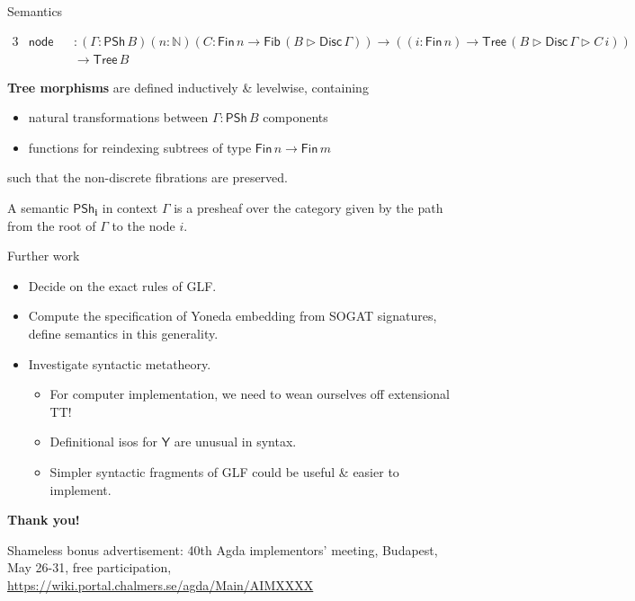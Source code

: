 \documentclass[dvipsnames,aspectratio=169]{beamer}
\newcommand{\ms}[1]{\mathsf{#1}}
\newcommand{\mbb}[1]{\mathbb{#1}}
\newcommand{\bs}[1]{\boldsymbol{#1}}
\newcommand{\Y}{\mathsf{Y}}
\newcommand{\Fib}{\mathsf{Fib}}
\newcommand{\Fin}{\mathsf{Fin}}
\newcommand{\Tree}{\mathsf{Tree}}
\newcommand{\Disc}{\mathsf{Disc}}
\newcommand{\PSh}{\mathsf{PSh}}
\newcommand{\ext}{\triangleright}
\begin{document}
\begin{frame}{Semantics}
\begin{block}{}
\vspace{-1em}
{\small
\begin{alignat*}{3}
  & \ms{node} &&: (\Gamma : \PSh\,B)(n : \mbb{N})(C : \Fin\,n \to \Fib\,(B \ext \Disc\,\Gamma)) \to ((i : \Fin\,n) \to \Tree\,(B \ext \Disc\,\Gamma \ext C\,i)) \\
  & &&\to \Tree\,B
\end{alignat*}
}
\end{block}
\vspace{2em}
\textbf{Tree morphisms} are defined inductively \& levelwise, containing
\begin{itemize}
\item natural transformations between $\Gamma : \PSh\,B$ components
\item functions for reindexing subtrees of type $\Fin\,n \to \Fin\,m$
\end{itemize}
such that the non-discrete fibrations are preserved.
\vspace{1em}

A semantic $\bs{\PSh_i}$ in context $\Gamma$ is a presheaf over the category given by the path from the root of $\Gamma$ to the node $i$.
\vspace{6em}
\end{frame}

\begin{frame}{Further work}

\begin{itemize}
\item Decide on the exact rules of GLF.
\item Compute the specification of Yoneda embedding from SOGAT signatures,
      define semantics in this generality.
\item Investigate syntactic metatheory.
  \begin{itemize}
    \item For computer implementation, we need to wean ourselves off extensional TT!
    \item Definitional isos for $\Y$ are unusual in syntax.
    \item Simpler syntactic fragments of GLF could be useful \& easier to implement.
  \end{itemize}
\end{itemize}
\vspace{1em}

\begin{center}
  \Large{\textbf{Thank you!}}
\end{center}
\vspace{1em}

\small
{Shameless bonus advertisement: 40th Agda implementors' meeting, Budapest, May 26-31, free participation,
\url{https://wiki.portal.chalmers.se/agda/Main/AIMXXXX}}


\end{frame}
\end{document}
